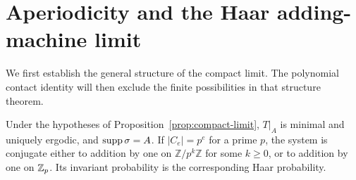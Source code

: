 \section{Aperiodicity and the Haar adding-machine limit}
\label{sec:adding-machine}

We first establish the general structure of the compact limit.
The polynomial contact identity will then exclude the finite
possibilities in that structure theorem.

\begin{proposition}\label{prop:odometer}
Under the hypotheses of Proposition~\ref{prop:compact-limit},
$T|_A$ is minimal and uniquely ergodic, and $\operatorname{supp}\sigma=A$.
If $|C_e|=p^e$ for a prime $p$, the system is conjugate either to
addition by one on $\mathbb Z/p^k\mathbb Z$ for some $k\ge0$,
or to addition by one on $\mathbb Z_p$. Its invariant probability is the
corresponding Haar probability.
\end{proposition}
